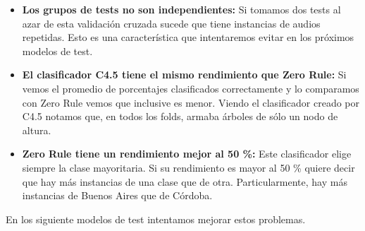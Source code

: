 \begin{itemize}
	\item \textbf{Los grupos de tests no son independientes:} Si tomamos dos tests al azar de esta validación cruzada sucede que tiene instancias de audios repetidas. Esto es una característica que intentaremos evitar en los próximos modelos de test.
	
	\item \textbf{El clasificador C4.5 tiene el mismo rendimiento que Zero Rule:} Si vemos el promedio de porcentajes clasificados correctamente y lo comparamos con Zero Rule vemos que inclusive es menor. Viendo el clasificador creado por C4.5 notamos que, en todos los folds, armaba árboles de sólo un nodo de altura. 
	
	\item \textbf{Zero Rule tiene un rendimiento mejor al 50 \%: } Este clasificador elige siempre la clase mayoritaria. Si su rendimiento es mayor al 50 \% quiere decir que hay más instancias de una clase que de otra. Particularmente, hay más instancias de Buenos Aires que de Córdoba.
\end{itemize}

En los siguiente modelos de test intentamos mejorar estos problemas.

